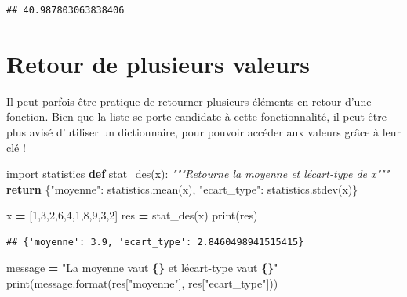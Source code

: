 \documentclass[
  12pt,
]{book}
\newenvironment{Shaded}{\begin{snugshade}}{\end{snugshade}}
\newcommand{\BuiltInTok}[1]{#1}
\newcommand{\CommentTok}[1]{\textcolor[rgb]{0.56,0.35,0.01}{\textit{#1}}}
\newcommand{\ControlFlowTok}[1]{\textcolor[rgb]{0.13,0.29,0.53}{\textbf{#1}}}
\newcommand{\DecValTok}[1]{\textcolor[rgb]{0.00,0.00,0.81}{#1}}
\newcommand{\ImportTok}[1]{#1}
\newcommand{\KeywordTok}[1]{\textcolor[rgb]{0.13,0.29,0.53}{\textbf{#1}}}
\newcommand{\NormalTok}[1]{#1}
\newcommand{\OperatorTok}[1]{\textcolor[rgb]{0.81,0.36,0.00}{\textbf{#1}}}
\newcommand{\SpecialCharTok}[1]{\textcolor[rgb]{0.81,0.36,0.00}{\textbf{#1}}}
\newcommand{\StringTok}[1]{\textcolor[rgb]{0.31,0.60,0.02}{#1}}
\numberwithin{equation}{section}
\numberwithin{countremarque}{section}
\begin{document}
\begin{lstlisting}
## 40.987803063838406
\end{lstlisting}

\section{Retour de plusieurs valeurs}\label{retour-de-plusieurs-valeurs}

Il peut parfois être pratique de retourner plusieurs éléments en retour d'une fonction. Bien que la liste se porte candidate à cette fonctionnalité, il peut-être plus avisé d'utiliser un dictionnaire, pour pouvoir accéder aux valeurs grâce à leur clé !

\begin{Shaded}
\begin{Highlighting}[]
\ImportTok{import}\NormalTok{ statistics}
\KeywordTok{def}\NormalTok{ stat\_des(x):}
  \CommentTok{"""Retourne la moyenne et l\textquotesingle{}écart{-}type de \textasciigrave{}x\textasciigrave{}"""}
  \ControlFlowTok{return}\NormalTok{ \{}\StringTok{"moyenne"}\NormalTok{: statistics.mean(x),}
  \StringTok{"ecart\_type"}\NormalTok{: statistics.stdev(x)\}}

\NormalTok{x }\OperatorTok{=}\NormalTok{ [}\DecValTok{1}\NormalTok{,}\DecValTok{3}\NormalTok{,}\DecValTok{2}\NormalTok{,}\DecValTok{6}\NormalTok{,}\DecValTok{4}\NormalTok{,}\DecValTok{1}\NormalTok{,}\DecValTok{8}\NormalTok{,}\DecValTok{9}\NormalTok{,}\DecValTok{3}\NormalTok{,}\DecValTok{2}\NormalTok{]}
\NormalTok{res }\OperatorTok{=}\NormalTok{ stat\_des(x)}
\BuiltInTok{print}\NormalTok{(res)}
\end{Highlighting}
\end{Shaded}

\begin{lstlisting}
## {'moyenne': 3.9, 'ecart_type': 2.8460498941515415}
\end{lstlisting}

\begin{Shaded}
\begin{Highlighting}[]
\NormalTok{message }\OperatorTok{=} \StringTok{"La moyenne vaut }\SpecialCharTok{\{\}}\StringTok{ et l\textquotesingle{}écart{-}type vaut }\SpecialCharTok{\{\}}\StringTok{"}
\BuiltInTok{print}\NormalTok{(message.}\BuiltInTok{format}\NormalTok{(res[}\StringTok{"moyenne"}\NormalTok{], res[}\StringTok{"ecart\_type"}\NormalTok{]))}
\end{Highlighting}
\end{Shaded}
\end{document}
